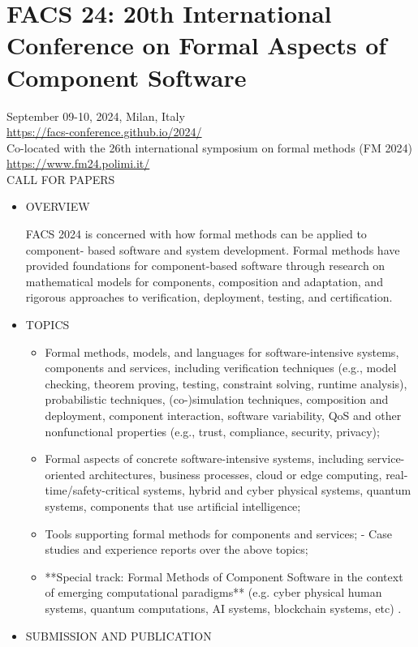 \documentclass[prodmode,acmtecs]{acmsmall} %
\begin{document}
\section{FACS 24: 20th International Conference on Formal Aspects of Component Software}\label{FACS24}  September 09-10, 2024, Milan, Italy\\ 
  \href{https://facs-conference.github.io/2024/}{https://facs-conference.github.io/2024/}\\ 
  Co-located with the 26th international symposium on formal methods (FM 2024) \href{https://www.fm24.polimi.it/}{https://www.fm24.polimi.it/}\\ 
CALL FOR PAPERS 

\begin{itemize}\item  OVERVIEW 
 
  FACS 2024 is concerned with how formal methods can be applied to component- based software and system development. Formal methods have provided foundations for component-based software through research on mathematical models for components, composition and adaptation, and rigorous approaches to verification, deployment, testing, and certification. 
 
\item  TOPICS 
 
\begin{itemize}\item  Formal methods, models, and languages for software-intensive systems, components and services, including verification techniques (e.g., model checking, theorem proving, testing, constraint solving, runtime analysis), probabilistic techniques, (co-)simulation techniques, composition and deployment, component interaction, software variability, QoS and other nonfunctional properties (e.g., trust, compliance, security, privacy);
\item  Formal aspects of concrete software-intensive systems, including service- oriented architectures, business processes, cloud or edge computing, real- time/safety-critical systems, hybrid and cyber physical systems, quantum systems, components that use artificial intelligence;
\item  Tools supporting formal methods for components and services; - Case studies and experience reports over the above topics;
\item  **Special track: Formal Methods of Component Software in the context of emerging computational paradigms** (e.g. cyber physical human systems, quantum computations, AI systems, blockchain systems, etc) .
\end{itemize} 
\item  SUBMISSION AND PUBLICATION 
 

\end{itemize}
\end{document}
